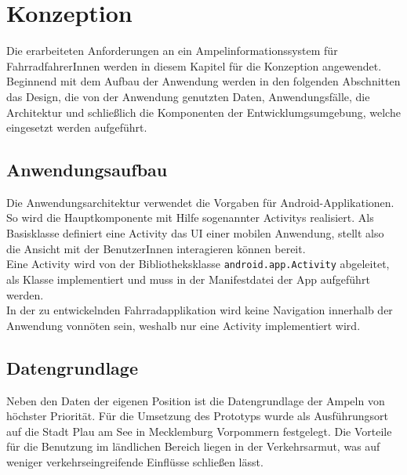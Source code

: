 \chapter{\label{chap:entwurf}Konzeption}
Die erarbeiteten Anforderungen an ein Ampelinformationssystem für FahrradfahrerInnen werden in diesem Kapitel für die Konzeption angewendet. Beginnend mit dem Aufbau der Anwendung werden in den folgenden Abschnitten das Design, die von der Anwendung genutzten Daten, Anwendungsfälle, die Architektur und schließlich die Komponenten der Entwicklumgsumgebung, welche eingesetzt werden aufgeführt. 
\section{Anwendungsaufbau}
Die Anwendungsarchitektur verwendet die Vorgaben für Android-Applikationen. So wird die Hauptkomponente mit Hilfe sogenannter \glspl{Activity} realisiert. Als Basisklasse definiert eine \gls{Activity} das \gls{UI} einer mobilen Anwendung, stellt also die Ansicht mit der BenutzerInnen interagieren können bereit.\\
Eine \gls{Activity} wird von der Bibliotheksklasse \texttt{android.app.Activity} abgeleitet, als Klasse implementiert und muss in der Manifestdatei der \gls{App} aufgeführt werden. \cite{android_activity} \\
In der zu entwickelnden Fahrradapplikation wird keine Navigation innerhalb der Anwendung vonnöten sein, weshalb nur eine \gls{Activity} implementiert wird.
%
%
\section{Datengrundlage}
Neben den Daten der eigenen Position ist die Datengrundlage der Ampeln von höchster Priorität. Für die Umsetzung des Prototyps wurde als Ausführungsort auf die Stadt Plau am See in Mecklemburg Vorpommern festgelegt. Die Vorteile für die Benutzung im ländlichen Bereich liegen in der Verkehrsarmut, was auf weniger verkehrseingreifende Einflüsse schließen lässt. 
